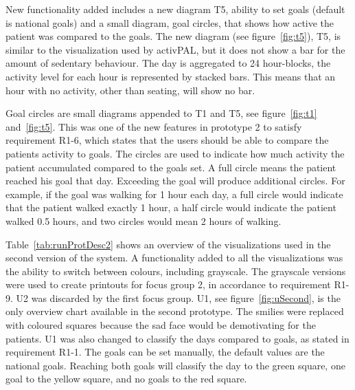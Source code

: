 New functionality added includes a new diagram T5, ability to set goals (default is national goals) and a small diagram, goal circles, that shows how active the patient was compared to the goals. The new diagram (see figure~\ref{fig:t5}), T5, is similar to the visualization used by activPAL, but it does not show a bar for the amount of sedentary behaviour. The day is aggregated to 24 hour-blocks, the activity level for each hour is represented by stacked bars. This means that an hour with no activity, other than seating, will show no bar. 

Goal circles are small diagrams appended to T1 and T5, see figure~\ref{fig:t1} and~\ref{fig:t5}. This was one of the new features in prototype 2 to satisfy requirement R1-6, which states that the users should be able to compare the patients activity to goals.  The circles are used to indicate how much activity the patient accumulated compared to the goals set. A full circle means the patient reached his goal that day. Exceeding the goal will produce additional circles. For example, if the goal was walking for 1 hour each day, a full circle would indicate that the patient walked exactly 1 hour, a half circle would indicate the patient walked 0.5 hours, and two circles would mean 2 hours of walking.

Table~\ref{tab:runProtDesc2} shows an overview of the visualizations used in the second version of the system. A functionality added to all the visualizations was the ability to switch between colours, including grayscale. The grayscale versions were used to create printouts for focus group 2, in accordance to requirement R1-9. U2 was discarded by the first focus group. U1, see figure~\ref{fig:uSecond}, is the only overview chart available in the second prototype. The smilies were replaced with coloured squares because the sad face would be demotivating for the patients. U1 was also changed to classify the days compared to goals, as stated in requirement R1-1. The goals can be set manually, the default values are the national goals. Reaching both goals will classify the day to the green square, one goal to the yellow square, and no goals to the red square.

